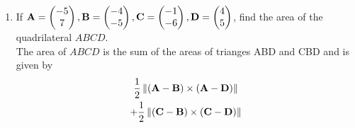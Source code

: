 \documentclass[journal,12pt,twocolumn]{IEEEtran}
\renewcommand\thesection{\arabic{section}}
\begin{document}
\begin{enumerate}[label=\thesection.\arabic*.,ref=\thesection.\theenumi]
\item If $\mathbf{A} = \begin{pmatrix}-5\\7\end{pmatrix}, \mathbf{B} = \begin{pmatrix}-4\\-5\end{pmatrix}, \mathbf{C} = \begin{pmatrix}-1\\-6\end{pmatrix}, \mathbf{D} = \begin{pmatrix}4\\5\end{pmatrix}$, find the area of the quadrilateral $ABCD$.
%
\\
\solution The area of  $ABCD$ is the sum of the areas of trianges ABD and CBD and is given by 
\begin{multline}
\frac{1}{2}\left\lVert\left(\mathbf{A}-\mathbf{B}\right)\times \left(\mathbf{A}-\mathbf{D}\right)\right\rVert
\\
+
\frac{1}{2}\left\lVert\left(\mathbf{C}-\mathbf{B}\right)\times \left(\mathbf{C}-\mathbf{D}\right)\right\rVert
\end{multline}
\end{enumerate}
\end{document}
